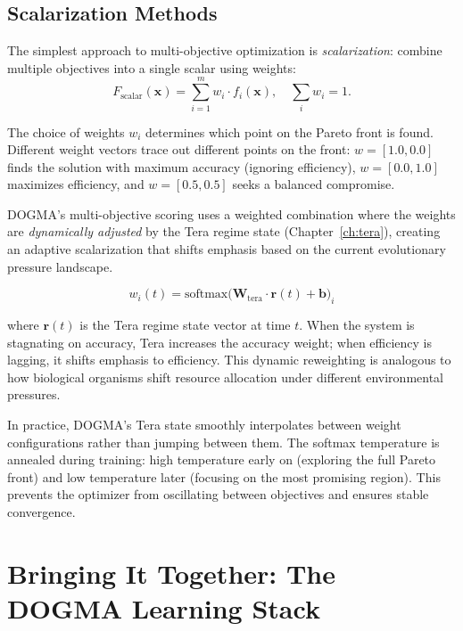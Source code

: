 \subsection{Scalarization Methods}

The simplest approach to multi-objective optimization is \emph{scalarization}: combine multiple objectives into a single scalar using weights:
\begin{equation}
F_{\text{scalar}}(\mathbf{x}) = \sum_{i=1}^m w_i \cdot f_i(\mathbf{x}), \quad \sum_i w_i = 1.
\end{equation}

The choice of weights $w_i$ determines which point on the Pareto front is found. Different weight vectors trace out different points on the front: $w = [1.0, 0.0]$ finds the solution with maximum accuracy (ignoring efficiency), $w = [0.0, 1.0]$ maximizes efficiency, and $w = [0.5, 0.5]$ seeks a balanced compromise.

DOGMA's multi-objective scoring uses a weighted combination where the weights are \emph{dynamically adjusted} by the Tera regime state (Chapter~\ref{ch:tera}), creating an adaptive scalarization that shifts emphasis based on the current evolutionary pressure landscape.

\begin{equation}
w_i(t) = \text{softmax}\bigl(\mathbf{W}_{\text{tera}} \cdot \mathbf{r}(t) + \mathbf{b}\bigr)_i
\label{eq:ml-tera-weights}
\end{equation}

where $\mathbf{r}(t)$ is the Tera regime state vector at time $t$. When the system is stagnating on accuracy, Tera increases the accuracy weight; when efficiency is lagging, it shifts emphasis to efficiency. This dynamic reweighting is analogous to how biological organisms shift resource allocation under different environmental pressures.

\begin{implnote}
In practice, DOGMA's Tera state smoothly interpolates between weight configurations rather than jumping between them. The softmax temperature is annealed during training: high temperature early on (exploring the full Pareto front) and low temperature later (focusing on the most promising region). This prevents the optimizer from oscillating between objectives and ensures stable convergence.
\end{implnote}

\section{Bringing It Together: The DOGMA Learning Stack}
\label{sec:dogma-learning-stack}

